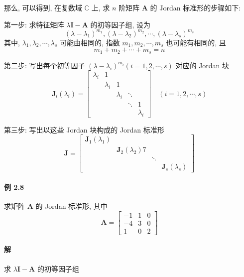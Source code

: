 \par 那么, 可以得到, 在复数域 $\mathbb{C}$ 上, 求 $n$ 阶矩阵 $\bm{A}$ 的 Jordan 标准形的步骤如下:
\par 第一步: 求特征矩阵 $\lambda\bm{I} - \bm{A}$ 的初等因子组, 设为
$$
    (\lambda - \lambda_1)^{m_1}, (\lambda - \lambda_2)^{m_2}, \cdots, (\lambda - \lambda_s)^{m_s}
$$
其中, $\lambda_1, \lambda_2, \cdots, \lambda_s$ 可能由相同的, 指数 $m_1, m_2, \cdots, m_s$ 也可能有相同的, 且
$$
    m_1 + m_2 + \cdots + m_s = n
$$
\par 第二步: 写出每个初等因子 $(\lambda - \lambda_i)^{m_i}(i = 1, 2, \cdots, s)$ 对应的 Jordan 块
$$
    \bm{J}_i(\lambda_i) = \begin{bmatrix}
        \lambda_i & 1         &           &        &           \\
                  & \lambda_i & 1         &        &           \\
                  &           & \lambda_i & \ddots &           \\
                  &           &           & \ddots & 1         \\
                  &           &           &        & \lambda_i
    \end{bmatrix} \quad (i = 1, 2, \cdots, s)
$$
\par 第三步: 写出以这些 Jordan 块构成的 Jordan 标准形
$$
    \bm{J} = \begin{bmatrix}
        \bm{J}_1(\lambda_1) &                       &        &                     \\
                            & \bm{J}_2(\lambda_2) 7 &                              \\
                            &                       & \ddots &                     \\
                            &                       &        & \bm{J}_s(\lambda_s)
    \end{bmatrix}
$$

\paragraph*{例 2.8} 求矩阵 $\bm{A}$ 的 Jordan 标准形, 其中
$$
    \bm{A} = \begin{bmatrix}
        -1 & 1 & 0 \\
        -4 & 3 & 0 \\
        1  & 0 & 2
    \end{bmatrix}
$$

\paragraph*{解} 求 $\lambda\bm{I} - \bm{A}$ 的初等因子组


